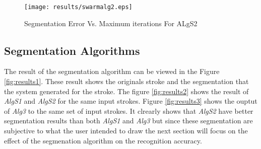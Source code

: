     
 \begin{figure}
	\centering		
	 \texttt{[image: results/swarmalg2.eps]}
	 	\caption{Segmentation Error Vs. Maximum iterations For ALgS2}
	 	\label{fig:swarmtestingS2}
\end{figure} 





\subsection{Segmentation Algorithms}
\label{sec:SegmentationAlgorithms}
The result of the segmentation algorithm can be viewed in the Figure \ref{fig:results1}. These result shows the originals stroke and the segmentation that the system generated for the stroke. The figure \ref{fig:results2} shows the result of \textsl{AlgS1} and \textsl{AlgS2} for the same input strokes.  Figure \ref{fig:results3} shows the ouptut of \textsl{Alg3} to the same set of input strokes. It clrearly shows that \textsl{AlgS2} have better segmentation results than both \textsl{AlgS1} and \textsl{Alg3} but since these segmentation are subjective to what the user intended to draw the next section will focus on the effect of the segmenation algorithm on the recognition accuracy. 

